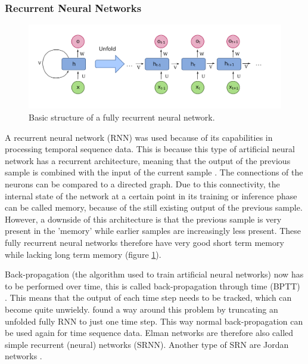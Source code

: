 \subsubsection{Recurrent Neural Networks}
\begin{figure}[t]
    \centering
    \includegraphics[width=1\textwidth]{images/fully_rnn.png}
    \caption{Basic structure of a fully recurrent neural network.}
    \label{fig:fully_rnn_example}
\end{figure}
A recurrent neural network (RNN) was used because of its capabilities in processing temporal sequence data. This is because this type of artificial neural network has a recurrent architecture, meaning that the output of the previous sample is combined with the input of the current sample \cite{Dupond2019thorough}. The connections of the neurons can be compared to a directed graph. Due to this connectivity, the internal state of the network at a certain point in its training or inference phase can be called memory, because of the still existing output of the previous sample. However, a downside of this architecture is that the previous sample is very present in the 'memory' while earlier samples are increasingly less present. These fully recurrent neural networks therefore have very good short term memory while lacking long term memory (figure \ref{fig:fully_rnn_example}).

Back-propagation (the algorithm used to train artificial neural networks) now has to be performed over time, this is called back-propagation through time (BPTT) \cite{Hochreiter1997long,Robinson1987utility,Werbos1988generalization}. This means that the output of each time step needs to be tracked, which can become quite unwieldy. \textcite{Elman1990finding} found a way around this problem by truncating an unfolded fully RNN to just one time step. This way normal back-propagation can be used again for time sequence data. Elman networks are therefore also called simple recurrent (neural) networks (SRNN). Another type of SRN are Jordan networks \cite{Jordan1997serial}.\\

